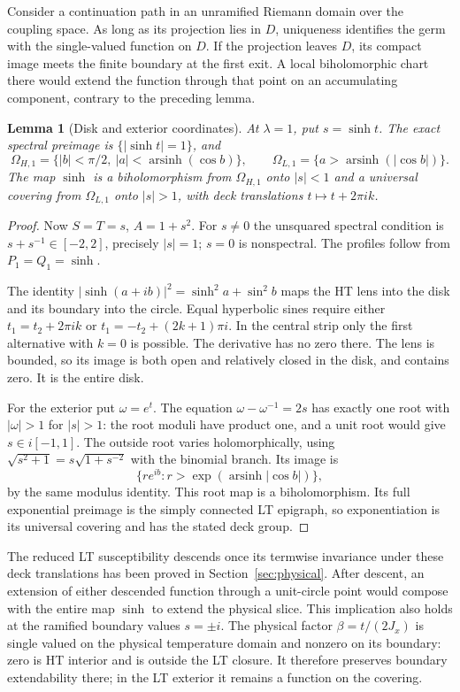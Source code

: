 \documentclass[11pt]{article}
\numberwithin{equation}{section}
\newtheorem{lemma}[theorem]{Lemma}
\theoremstyle{definition}
\begin{document}
Consider a continuation path in an unramified Riemann domain over
the coupling space. As long as its projection lies in $D$, uniqueness
identifies the germ with the single-valued function on $D$. If the
projection leaves $D$, its compact image meets the finite boundary
at the first exit. A local biholomorphic chart there would extend the
function through that point on an accumulating component, contrary
to the preceding lemma.

\begin{lemma}[Disk and exterior coordinates]
\label{geo:new:cover}
At $\lambda=1$, put $s=\sinh t$.  The exact spectral preimage is
$\{|\sinh t|=1\}$, and
\[
 \Omega_{H,1}=\{|b|<\pi/2,\ |a|<\operatorname{arsinh}(\cos b)\},
 \qquad
 \Omega_{L,1}=\{a>\operatorname{arsinh}(|\cos b|)\}.
\]
The map $\sinh$ is a biholomorphism from $\Omega_{H,1}$ onto
$|s|<1$ and a universal covering from $\Omega_{L,1}$ onto
$|s|>1$, with deck translations $t\mapsto t+2\pi i k$.
\end{lemma}
\begin{proof}
Now $S=T=s$, $A=1+s^2$.  For $s\ne0$ the unsquared
spectral condition is $s+s^{-1}\in[-2,2]$, precisely $|s|=1$;
$s=0$ is nonspectral.  The profiles follow from
$P_1=Q_1=\sinh$.

The identity $|\sinh(a+ib)|^2=\sinh^2a+\sin^2b$
maps the HT lens into the disk and its boundary into the circle.
Equal hyperbolic sines require either
$t_1=t_2+2\pi i k$ or $t_1=-t_2+(2k+1)\pi i$.
In the central strip only the first alternative with $k=0$
is possible.  The derivative has no zero there.  The lens is
bounded, so its image is both open and relatively closed in
the disk, and contains zero.  It is the entire disk.

For the exterior put $\omega=e^t$.  The equation
$\omega-\omega^{-1}=2s$ has exactly one root with $|\omega|>1$
for $|s|>1$: the root moduli have product one, and a unit root
would give $s\in i[-1,1]$.  The outside root varies holomorphically,
using $\sqrt{s^2+1}=s\sqrt{1+s^{-2}}$ with the binomial branch.
Its image is
\[
 \{re^{ib}:r>\exp(\operatorname{arsinh}|\cos b|)\},
\]
by the same modulus identity.  This root map is a biholomorphism.
Its full exponential preimage is the simply connected LT epigraph,
so exponentiation is its universal covering and has the stated
deck group.
\end{proof}

The reduced LT susceptibility descends once its termwise invariance
under these deck translations has been proved in
Section~\ref{sec:physical}. After descent, an extension of either
descended function through a unit-circle point would compose with the
entire map $\sinh$ to extend the physical slice. This implication also
holds at the ramified boundary values $s=\pm i$. The physical factor
$\beta=t/(2J_x)$
is single valued on the physical temperature domain and nonzero
on its boundary: zero is HT interior and is outside the LT
closure.  It therefore preserves boundary extendability there;
in the LT exterior it remains a function on the covering.
\end{document}
